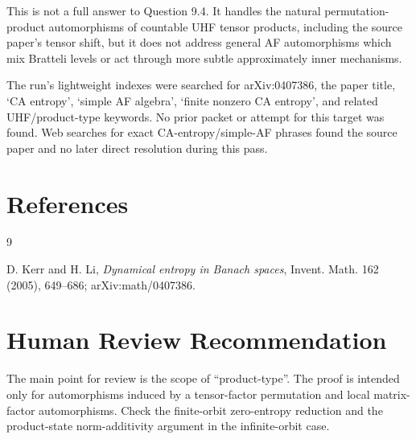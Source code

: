 \documentclass[11pt]{article}
\begin{document}
This is not a full answer to Question 9.4. It handles the natural
permutation-product automorphisms of countable UHF tensor products, including
the source paper's tensor shift, but it does not address general AF
automorphisms which mix Bratteli levels or act through more subtle
approximately inner mechanisms.

The run's lightweight indexes were searched for arXiv:0407386, the paper
title, `CA entropy', `simple AF algebra', `finite nonzero CA entropy', and
related UHF/product-type keywords. No prior packet or attempt for this target
was found. Web searches for exact CA-entropy/simple-AF phrases found the source
paper and no later direct resolution during this pass.

\section*{References}

\begin{thebibliography}{9}

D. Kerr and H. Li,
\emph{Dynamical entropy in Banach spaces},
Invent. Math. 162 (2005), 649--686; arXiv:math/0407386.

\end{thebibliography}

\section*{Human Review Recommendation}

The main point for review is the scope of ``product-type''. The proof is
intended only for automorphisms induced by a tensor-factor permutation and
local matrix-factor automorphisms. Check the finite-orbit zero-entropy
reduction and the product-state norm-additivity argument in the infinite-orbit
case.
\end{document}
